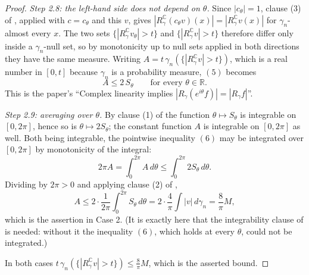 \begin{proof}
\emph{Step 2.8: the left-hand side does not depend on $\theta$.}
Since $|c_\theta| = 1$, clause (3) of ,
applied with $c = c_\theta$ and this $v$, gives
$|R_\gamma^{\mathbb{C}}(c_\theta v)(x)| = |R_\gamma^{\mathbb{C}} v(x)|$ for
$\gamma_n$-almost every $x$.  The two sets
$\{|R_\gamma^{\mathbb{C}} v_\theta| > t\}$ and
$\{|R_\gamma^{\mathbb{C}} v| > t\}$ therefore differ only inside a
$\gamma_n$-null set, so by monotonicity up to null sets applied in both
directions they have the same measure.  Writing
$A = t\,\gamma_n(\{|R_\gamma^{\mathbb{C}} v| > t\})$, which is a real number in
$[0,t]$ because $\gamma_n$ is a probability measure, $(5)$ becomes
\begin{equation*}
  A \leq 2\,S_\theta \qquad\text{for every } \theta \in \mathbb{R}. \tag{6}
\end{equation*}
This is the paper's ``Complex linearity implies
$|R_\gamma(e^{i\theta}f)| = |R_\gamma f|$''.

\emph{Step 2.9: averaging over $\theta$.}
By clause (1) of  the function $\theta \mapsto S_\theta$
is integrable on $[0,2\pi]$, hence so is $\theta \mapsto 2S_\theta$; the constant
function $A$ is integrable on $[0,2\pi]$ as well.  Both being integrable, the
pointwise inequality $(6)$ may be integrated over $[0,2\pi]$ by monotonicity of
the integral:
\[
  2\pi A = \int_0^{2\pi} A \, d\theta \leq \int_0^{2\pi} 2S_\theta \, d\theta .
\]
Dividing by $2\pi > 0$ and applying clause (2) of ,
\[
  A \leq 2 \cdot \frac{1}{2\pi}\int_0^{2\pi} S_\theta \, d\theta
    = 2 \cdot \frac{4}{\pi}\int |v| \, d\gamma_n
    = \frac{8}{\pi}M ,
\]
which is the assertion in Case 2.  (It is exactly here that the integrability
clause of  is needed: without it the inequality
$(6)$, which holds at every $\theta$, could not be integrated.)

In both cases
$t\,\gamma_n(\{|R_\gamma^{\mathbb{C}} v| > t\}) \leq \frac{8}{\pi}M$, which is
the asserted bound.
\end{proof}
